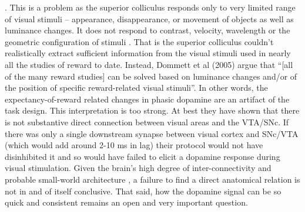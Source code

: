 \documentclass[doc,12pt]{apa}        %
\begin{document}
{}. This is a problem as the superior colliculus responds only to very limited range of visual stimuli -- appearance, disappearance, or movement of objects as well as luminance changes.  It does not respond to contrast, velocity, wavelength or the geometric configuration of stimuli \cite{Dommett:2005p7263}. That is the superior colliculus couldn't realistically extract sufficient information from the visual stimuli used in nearly all the studies of reward to date.  Instead, Dommett et al (2005) argue that ``[all of the many reward studies] can be solved based on luminance changes and/or of the position of specific reward-related visual stimuli''.  In other words, the expectancy-of-reward related changes in phasic dopamine are an artifact of the task design.  This interpretation is too strong.  At best they have shown that there is not substantive direct connection between visual areas and the VTA/SNc.  If there was only a single downstream synapse between visual cortex and SNc/VTA (which would add around 2-10 ms in lag) their protocol would not have disinhibited it and so would have failed to elicit a dopamine response during visual stimulation.   Given the brain's high degree of inter-connectivity and probable small-world architecture \cite{bassett:2006aa}, a failure to find a direct anatomical relation is not in and of itself conclusive.  That said, how the dopamine signal can be so quick and consistent remains an open and very important question.
\end{document}
